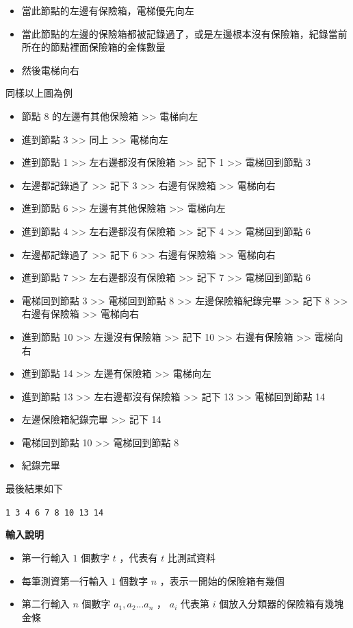     \begin{itemize}
        \item 當此節點的左邊有保險箱，電梯優先向左
        \item 當此節點的左邊的保險箱都被記錄過了，或是左邊根本沒有保險箱，紀錄當前所在的節點裡面保險箱的金條數量
        \item 然後電梯向右
    \end{itemize}

    同樣以上圖為例

    \begin{itemize}
        \item 節點 8 的左邊有其他保險箱 >> 電梯向左
        \item 進到節點 3 >> 同上 >> 電梯向左
        \item 進到節點 1 >> 左右邊都沒有保險箱 >> 記下 1 >> 電梯回到節點 3
        \item 左邊都記錄過了 >> 記下 3 >> 右邊有保險箱 >> 電梯向右
        \item 進到節點 6 >> 左邊有其他保險箱 >> 電梯向左
        \item 進到節點 4 >> 左右邊都沒有保險箱 >> 記下 4 >> 電梯回到節點 6
        \item 左邊都記錄過了 >> 記下 6 >> 右邊有保險箱 >> 電梯向右
        \item 進到節點 7 >> 左右邊都沒有保險箱 >> 記下 7 >> 電梯回到節點 6
        \item 電梯回到節點 3 >> 電梯回到節點 8 >> 左邊保險箱紀錄完畢 >> 記下 8 >> 右邊有保險箱 >> 電梯向右
        \item 進到節點 10 >> 左邊沒有保險箱 >> 記下 10 >> 右邊有保險箱 >> 電梯向右
        \item 進到節點 14 >> 左邊有保險箱 >> 電梯向左
        \item 進到節點 13 >> 左右邊都沒有保險箱 >> 記下 13 >> 電梯回到節點 14
        \item 左邊保險箱紀錄完畢 >> 記下 14
        \item 電梯回到節點 10 >> 電梯回到節點 8
        \item 紀錄完畢
    \end{itemize}

    最後結果如下

    \verb|1 3 4 6 7 8 10 13 14|

    \textbf{輸入說明}

    \begin{itemize}
        \item 第一行輸入 $1$ 個數字 $t$ ，代表有 $t$ 比測試資料
        \item 每筆測資第一行輸入 $1$ 個數字 $n$ ，表示一開始的保險箱有幾個
        \item 第二行輸入 $n$ 個數字 $a_1,a_2...a_n$ ， $a_i$ 代表第 $i$ 個放入分類器的保險箱有幾塊金條
    \end{itemize}

